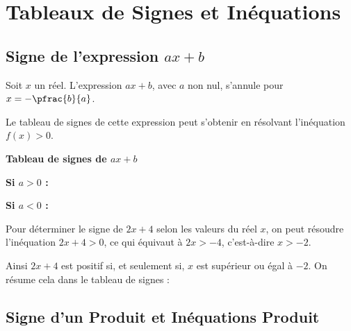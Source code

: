 \chapter{Tableaux de Signes et Inéquations}

\section{Signe de l'expression \texorpdfstring{$ax+b$}{ax+b}}

Soit $x$ un réel. L'expression $ax+b$, avec $a$ non nul, s'annule pour $x = -\pfrac{b}{a}$.

Le tableau de signes de cette expression peut s'obtenir en résolvant l'inéquation $f(x) > 0$.

\begin{center}
	\textbf{Tableau de signes de $ax+b$}
\end{center}

\begin{center}
	\textbf{Si $a > 0$ :}
\end{center}

\begin{center}
	\textbf{Si $a < 0$ :}
\end{center}

\begin{exemple}
	Pour déterminer le signe de $2x+4$ selon les valeurs du réel $x$, on peut résoudre l'inéquation $2x+4 > 0$, ce qui équivaut à $2x > -4$, c'est-à-dire $x > -2$.

	Ainsi $2x+4$ est positif si, et seulement si, $x$ est supérieur ou égal à $-2$. On résume cela dans le tableau de signes :

	\begin{center}
	\end{center}
\end{exemple}

\section{Signe d'un Produit et Inéquations Produit}

